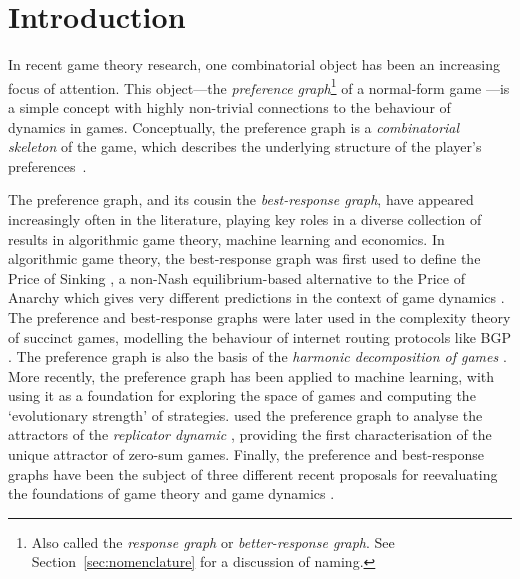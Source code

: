 \documentclass[preprint,authoryear]{elsarticle}
\begin{document}
\maketitle

\section{Introduction}
In recent game theory research, one combinatorial object has been an increasing focus of attention. This object---the \emph{preference graph}\footnote{Also called the \emph{response graph} or \emph{better-response graph}. See Section~\ref{sec:nomenclature} for a discussion of naming.} of a normal-form game \citep{biggar_graph_2023,biggar_attractor_2024}---is a simple concept with highly non-trivial connections to the behaviour of dynamics in games. Conceptually, the preference graph is a \emph{combinatorial skeleton} of the game, which describes the underlying structure of the player's preferences~\citep{pangallo_best_2019}.

The preference graph, and its cousin the \emph{best-response graph}, have appeared increasingly often in the literature, playing key roles in a diverse collection of results in algorithmic game theory, machine learning and economics. In algorithmic game theory, the best-response graph was first used to define the Price of Sinking \citep{goemans_sink_2005,mirrokni_convergence_2004}, a non-Nash equilibrium-based alternative to the Price of Anarchy \citep{roughgarden2010algorithmic} which gives very different predictions in the context of game dynamics \citep{kleinberg_beyond_2011}. The preference and best-response graphs were later used in the complexity theory of succinct games, modelling the behaviour of internet routing protocols like BGP \citep{fabrikant2008complexity,mirrokni_complexity_2009}. The preference graph is also the basis of the \emph{harmonic decomposition of games} \citep{candogan_flows_2011}. More recently, the preference graph has been applied to machine learning, with \cite{omidshafiei_-rank_2019,omidshafiei_navigating_2020} using it as a foundation for exploring the space of games and computing the `evolutionary strength' of strategies. \cite{biggar_replicator_2023,biggar_attractor_2024} used the preference graph to analyse the attractors of the \emph{replicator dynamic} \citep{taylor_evolutionary_1978}, providing the first characterisation of the unique attractor of zero-sum games. 
Finally, the preference and best-response graphs have been the subject of three different recent proposals for reevaluating the foundations of game theory and game dynamics \citep{papadimitriou_game_2019,pangallo_best_2019,biggar_graph_2023}.%
\end{document}
